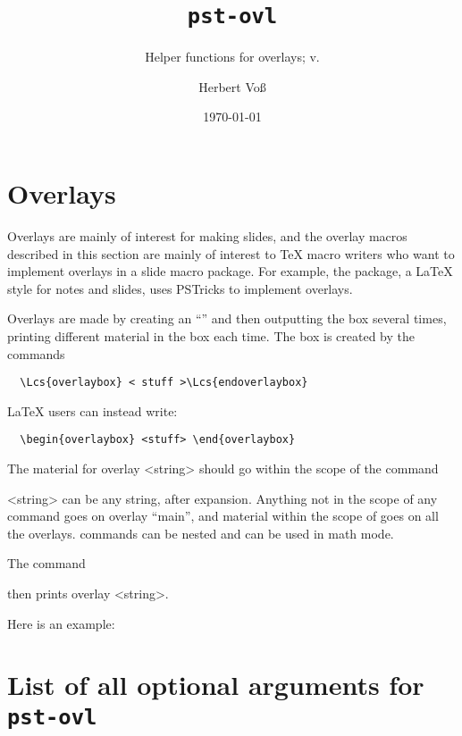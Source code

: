 \documentclass[11pt,english,BCOR10mm,DIV12,bibliography=totoc,parskip=false,
   smallheadings, headexclude,footexclude,oneside]{pst-doc}
\let\pstOVLFV\fileversion
\begin{document}
\title{\texttt{pst-ovl}}
\subtitle{Helper functions for overlays; v.\pstOVLFV}
\author{Herbert Vo\ss}
\docauthor{}
\date{\today}
\maketitle

\tableofcontents
{}

\section{Overlays}

Overlays are mainly of interest for making slides, and the overlay macros
described in this section are mainly of interest to \TeX{} macro writers who
want to implement overlays in a slide macro package.  For example, the
 package, a \LaTeX{} style for notes and slides, uses PSTricks to
implement overlays.

Overlays are made by creating an "`"' and then outputting the box several
times, printing different material in the box each time. The box is created by
the commands
\begin{lstlisting}
  \Lcs{overlaybox} < stuff >\Lcs{endoverlaybox}
\end{lstlisting}
\LaTeX{} users can instead write:
\begin{lstlisting}
  \begin{overlaybox} <stuff> \end{overlaybox}
\end{lstlisting}

The material for overlay <string> should go within the scope of the command


<string> can be any string, after expansion. Anything not in the scope of any
 command goes on overlay "`main"', and material within the scope of
 goes on all the overlays. 
commands can be nested and can be used in math mode.

The command


then prints overlay <string>.

Here is an example:

\begin{LTXexample}[pos=t]
\overlaybox
{}
 \endoverlaybox

 \hspace{.5in} 
\end{LTXexample}



\clearpage
\section{List of all optional arguments for \texttt{pst-ovl}}





\bgroup
\raggedright
\nocite{*}


\egroup

\printindex
\end{document}
